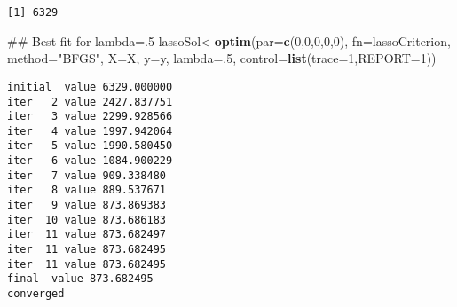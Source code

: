\documentclass[10pt,]{article}
\newenvironment{Shaded}{\begin{snugshade}}{\end{snugshade}}
\newcommand{\KeywordTok}[1]{\textcolor[rgb]{0.13,0.29,0.53}{\textbf{{#1}}}}
\newcommand{\DataTypeTok}[1]{\textcolor[rgb]{0.13,0.29,0.53}{{#1}}}
\newcommand{\DecValTok}[1]{\textcolor[rgb]{0.00,0.00,0.81}{{#1}}}
\newcommand{\StringTok}[1]{\textcolor[rgb]{0.31,0.60,0.02}{{#1}}}
\newcommand{\NormalTok}[1]{{#1}}
\begin{document}
\begin{Shaded}
\end{Shaded}

\begin{verbatim}
[1] 6329
\end{verbatim}

\begin{Shaded}
\begin{Highlighting}[]
\NormalTok{## Best fit for lambda=.5}
\NormalTok{lassoSol<-}\KeywordTok{optim}\NormalTok{(}\DataTypeTok{par=}\KeywordTok{c}\NormalTok{(}\DecValTok{0}\NormalTok{,}\DecValTok{0}\NormalTok{,}\DecValTok{0}\NormalTok{,}\DecValTok{0}\NormalTok{,}\DecValTok{0}\NormalTok{),}
             \DataTypeTok{fn=}\NormalTok{lassoCriterion,}
             \DataTypeTok{method=}\StringTok{"BFGS"}\NormalTok{,}
             \DataTypeTok{X=}\NormalTok{X,}
             \DataTypeTok{y=}\NormalTok{y,}
         \DataTypeTok{lambda=}\NormalTok{.}\DecValTok{5}\NormalTok{,}
             \DataTypeTok{control=}\KeywordTok{list}\NormalTok{(}\DataTypeTok{trace=}\DecValTok{1}\NormalTok{,}\DataTypeTok{REPORT=}\DecValTok{1}\NormalTok{))}
\end{Highlighting}
\end{Shaded}

\begin{verbatim}
initial  value 6329.000000 
iter   2 value 2427.837751
iter   3 value 2299.928566
iter   4 value 1997.942064
iter   5 value 1990.580450
iter   6 value 1084.900229
iter   7 value 909.338480
iter   8 value 889.537671
iter   9 value 873.869383
iter  10 value 873.686183
iter  11 value 873.682497
iter  11 value 873.682495
iter  11 value 873.682495
final  value 873.682495 
converged
\end{verbatim}
\end{document}
